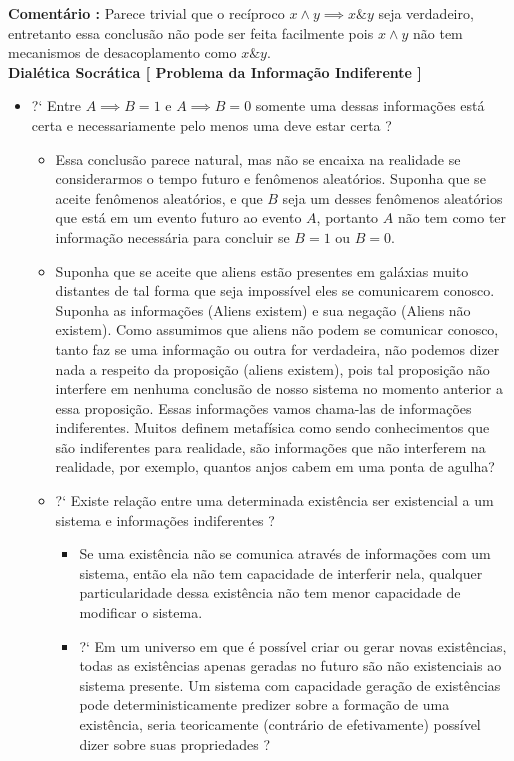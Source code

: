 \documentclass[10pt,a4paper]{report}
\begin{document}
\textbf{Comentário :} Parece trivial que o recíproco $ x \wedge y \implies x \& y $ seja verdadeiro, entretanto essa conclusão não pode ser feita facilmente pois $x \wedge y$ não tem mecanismos de desacoplamento como $x \& y$.\\

\textbf{Dialética Socrática [ Problema da Informação Indiferente ]} 

\begin{itemize}
	\item[ ] ?` Entre $A \implies B=1$ e $A \implies B=0 $ somente uma dessas informações está certa e necessariamente pelo menos uma deve estar certa ? 
	\begin{itemize}
		\item[ (i) ]  Essa conclusão parece natural, mas não se encaixa na realidade se considerarmos o tempo futuro e fenômenos aleatórios. Suponha que se aceite fenômenos aleatórios, e que $B$ seja um desses fenômenos aleatórios que está em um evento futuro ao evento $A$, portanto $A$ não tem como ter informação necessária para concluir se $B=1$ ou $B=0$.
		\item[ (ii) ] Suponha que se aceite que aliens estão presentes em galáxias muito distantes de tal forma que seja impossível eles se comunicarem conosco. Suponha as informações (Aliens existem) e sua negação (Aliens não existem). Como assumimos que aliens não podem se comunicar conosco, tanto faz se uma informação ou outra for verdadeira, não podemos dizer nada a respeito da proposição (aliens existem), pois tal proposição não interfere em nenhuma conclusão de nosso sistema no momento anterior a essa proposição. Essas informações vamos chama-las de informações indiferentes. Muitos definem metafísica como sendo conhecimentos que são indiferentes para realidade, são informações que não interferem na realidade, por exemplo, quantos anjos cabem em uma ponta de agulha?
		\item[ ] ?` Existe relação entre uma determinada existência ser existencial a um sistema e informações indiferentes ?
		\begin{itemize}
			\item[ (i) ] Se uma existência não se comunica através de informações com um sistema, então ela não tem capacidade de interferir nela, qualquer particularidade dessa existência não tem menor capacidade de modificar o sistema.
			\item[ ] ?` Em um universo em que é possível criar ou gerar novas existências, todas as existências apenas geradas no futuro são não existenciais ao sistema presente. Um sistema com capacidade geração de existências pode deterministicamente predizer sobre a formação de uma existência, seria teoricamente (contrário de efetivamente) possível dizer sobre suas propriedades ?
		\end{itemize}
	\end{itemize}
\end{itemize}
\end{document}
